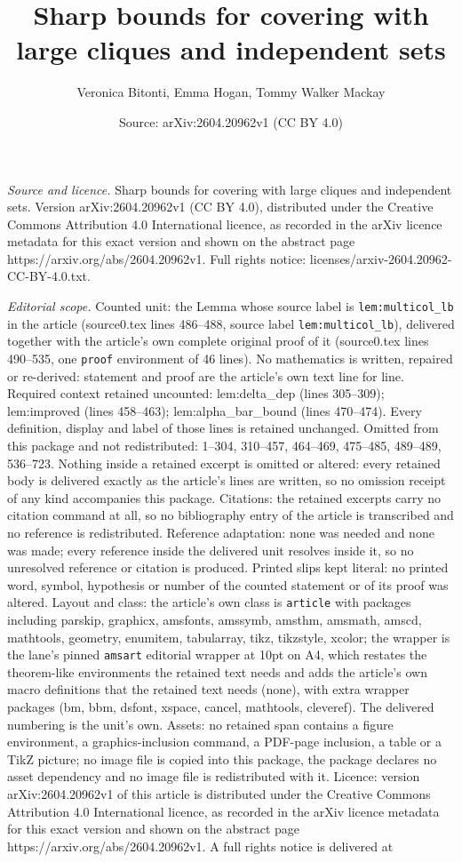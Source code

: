 \documentclass[10pt,a4paper]{amsart}
\title[Sharp bounds for covering with large cliques and independent]{Sharp bounds for covering with large cliques and independent sets}
\author{Veronica Bitonti, Emma Hogan, Tommy Walker Mackay}
\date{Source: arXiv:2604.20962v1 (CC BY 4.0)}
\begin{document}
\maketitle

\noindent\emph{Source and licence.} Sharp bounds for covering with large cliques and independent sets. Version arXiv:2604.20962v1 (CC BY 4.0), distributed under the Creative Commons Attribution 4.0 International licence, as recorded in the arXiv licence metadata for this exact version and shown on the abstract page https://arxiv.org/abs/2604.20962v1. Full rights notice: licenses/arxiv-2604.20962-CC-BY-4.0.txt.\par\smallskip

\noindent\textit{Editorial scope.} Counted unit: the Lemma whose source label is \texttt{lem:multicol\_lb} in the article (source0.tex lines 486--488, source label \texttt{lem:multicol\_lb}), delivered together with the article's own complete original proof of it (source0.tex lines 490--535, one \texttt{proof} environment of 46 lines). No mathematics is written, repaired or re-derived: statement and proof are the article's own text line for line. Required context retained uncounted: lem:delta\_dep (lines 305--309); lem:improved (lines 458--463); lem:alpha\_bar\_bound (lines 470--474). Every definition, display and label of those lines is retained unchanged. Omitted from this package and not redistributed: 1--304, 310--457, 464--469, 475--485, 489--489, 536--723. Nothing inside a retained excerpt is omitted or altered: every retained body is delivered exactly as the article's lines are written, so no omission receipt of any kind accompanies this package. Citations: the retained excerpts carry no citation command at all, so no bibliography entry of the article is transcribed and no reference is redistributed. Reference adaptation: none was needed and none was made; every reference inside the delivered unit resolves inside it, so no unresolved reference or citation is produced. Printed slips kept literal: no printed word, symbol, hypothesis or number of the counted statement or of its proof was altered. Layout and class: the article's own class is \texttt{article} with packages including parskip, graphicx, amsfonts, amssymb, amsthm, amsmath, amscd, mathtools, geometry, enumitem, tabularray, tikz, tikzstyle, xcolor; the wrapper is the lane's pinned \texttt{amsart} editorial wrapper at 10pt on A4, which restates the theorem-like environments the retained text needs and adds the article's own macro definitions that the retained text needs (none), with extra wrapper packages (bm, bbm, dsfont, xspace, cancel, mathtools, cleveref). The delivered numbering is the unit's own. Assets: no retained span contains a figure environment, a graphics-inclusion command, a PDF-page inclusion, a table or a TikZ picture; no image file is copied into this package, the package declares no asset dependency and no image file is redistributed with it. Licence: version arXiv:2604.20962v1 of this article is distributed under the Creative Commons Attribution 4.0 International licence, as recorded in the arXiv licence metadata for this exact version and shown on the abstract page https://arxiv.org/abs/2604.20962v1. A full rights notice is delivered at 
\end{document}
